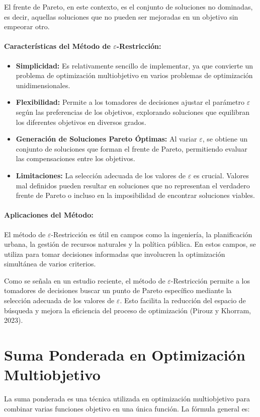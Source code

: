 \documentclass[12pt]{article}
\begin{document}
El frente de Pareto, en este contexto, es el conjunto de soluciones no dominadas, es decir, aquellas soluciones que no pueden ser mejoradas en un objetivo sin empeorar otro.

\paragraph{Características del Método de $\varepsilon$-Restricción:}
\begin{itemize}
	\item \textbf{Simplicidad:} Es relativamente sencillo de implementar, ya que convierte un problema de optimización multiobjetivo en varios problemas de optimización unidimensionales.
	\item \textbf{Flexibilidad:} Permite a los tomadores de decisiones ajustar el parámetro $\varepsilon$ según las preferencias de los objetivos, explorando soluciones que equilibran los diferentes objetivos en diversos grados.
	\item \textbf{Generación de Soluciones Pareto Óptimas:} Al variar $\varepsilon$, se obtiene un conjunto de soluciones que forman el frente de Pareto, permitiendo evaluar las compensaciones entre los objetivos.
	\item \textbf{Limitaciones:} La selección adecuada de los valores de $\varepsilon$ es crucial. Valores mal definidos pueden resultar en soluciones que no representan el verdadero frente de Pareto o incluso en la imposibilidad de encontrar soluciones viables.
\end{itemize}

\paragraph{Aplicaciones del Método:}
El método de $\varepsilon$-Restricción es útil en campos como la ingeniería, la planificación urbana, la gestión de recursos naturales y la política pública. En estos campos, se utiliza para tomar decisiones informadas que involucren la optimización simultánea de varios criterios.

Como se señala en un estudio reciente, el método de $\varepsilon$-Restricción permite a los tomadores de decisiones buscar un punto de Pareto específico mediante la selección adecuada de los valores de $\varepsilon$. Esto facilita la reducción del espacio de búsqueda y mejora la eficiencia del proceso de optimización (Pirouz y Khorram, 2023).
\section*{Suma Ponderada en Optimización Multiobjetivo}
La suma ponderada es una técnica utilizada en optimización multiobjetivo para combinar varias funciones objetivo en una única función. La fórmula general es:
\end{document}
